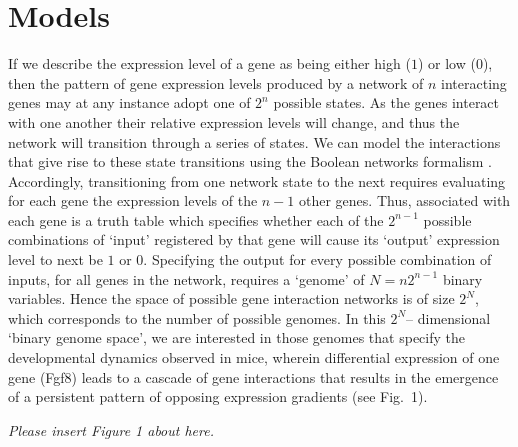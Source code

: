 \documentclass[10pt,letterpaper]{article}
\begin{document}

\section*{Models}

If we describe the expression level of a gene as being either high ($1$) or low ($0$), then the pattern of gene expression levels produced by a network of $n$ interacting genes may at any instance adopt one of $2^n$ possible states. As the genes interact with one another their relative expression levels will change, and thus the network will transition through a series of states. We can model the interactions that give rise to these state transitions using the Boolean networks formalism \cite{Kauffman1993}. Accordingly, transitioning from one network state to the next requires evaluating for each gene the expression levels of the $n-1$ other genes. Thus, associated with each gene is a truth table which specifies whether each of the $2^{n-1}$ possible combinations of `input' registered by that gene will cause its `output' expression level to next be $1$ or $0$. Specifying the output for every possible combination of inputs, for all genes in the network,  requires a `genome' of $N=n2^{n-1}$ binary variables. Hence the space of possible gene interaction networks is of size $2^N$, which corresponds to the number of possible genomes. In this $2^N$-- dimensional `binary genome space', we are interested in those genomes that specify the developmental dynamics observed in mice, wherein differential expression of one gene (Fgf8) leads to a cascade of gene interactions that results in the emergence of a persistent pattern of opposing expression gradients (see Fig.~1). %

\vspace{1em}\emph{\noindent Please insert Figure 1 about here.}\vspace{1em}
\end{document}
